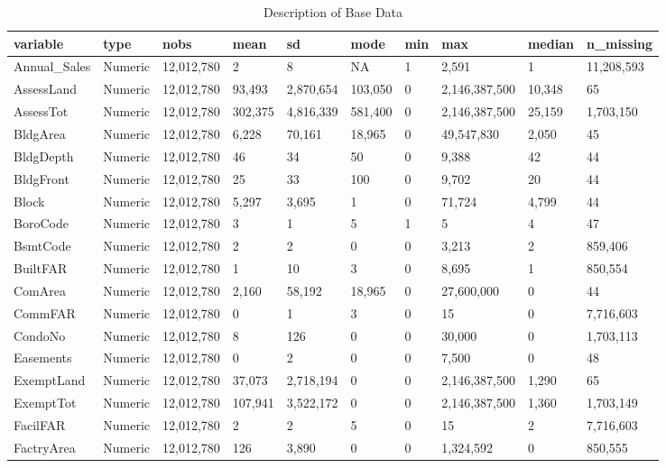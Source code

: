 \documentclass[conference,final,]{IEEEtran}
\begin{document}
\begin{table}

\caption{\label{tab:descripTable}\label{tab:descripTable} Description of Base Data}
\centering
\begin{tabular}[t]{l|l|l|l|l|l|l|l|l|l}
\hline
variable & type & nobs & mean & sd & mode & min & max & median & n\_missing\\
\hline
Annual\_Sales & Numeric & 12,012,780 & 2 & 8 & NA & 1 & 2,591 & 1 & 11,208,593\\
\hline
AssessLand & Numeric & 12,012,780 & 93,493 & 2,870,654 & 103,050 & 0 & 2,146,387,500 & 10,348 & 65\\
\hline
AssessTot & Numeric & 12,012,780 & 302,375 & 4,816,339 & 581,400 & 0 & 2,146,387,500 & 25,159 & 1,703,150\\
\hline
BldgArea & Numeric & 12,012,780 & 6,228 & 70,161 & 18,965 & 0 & 49,547,830 & 2,050 & 45\\
\hline
BldgDepth & Numeric & 12,012,780 & 46 & 34 & 50 & 0 & 9,388 & 42 & 44\\
\hline
BldgFront & Numeric & 12,012,780 & 25 & 33 & 100 & 0 & 9,702 & 20 & 44\\
\hline
Block & Numeric & 12,012,780 & 5,297 & 3,695 & 1 & 0 & 71,724 & 4,799 & 44\\
\hline
BoroCode & Numeric & 12,012,780 & 3 & 1 & 5 & 1 & 5 & 4 & 47\\
\hline
BsmtCode & Numeric & 12,012,780 & 2 & 2 & 0 & 0 & 3,213 & 2 & 859,406\\
\hline
BuiltFAR & Numeric & 12,012,780 & 1 & 10 & 3 & 0 & 8,695 & 1 & 850,554\\
\hline
ComArea & Numeric & 12,012,780 & 2,160 & 58,192 & 18,965 & 0 & 27,600,000 & 0 & 44\\
\hline
CommFAR & Numeric & 12,012,780 & 0 & 1 & 3 & 0 & 15 & 0 & 7,716,603\\
\hline
CondoNo & Numeric & 12,012,780 & 8 & 126 & 0 & 0 & 30,000 & 0 & 1,703,113\\
\hline
Easements & Numeric & 12,012,780 & 0 & 2 & 0 & 0 & 7,500 & 0 & 48\\
\hline
ExemptLand & Numeric & 12,012,780 & 37,073 & 2,718,194 & 0 & 0 & 2,146,387,500 & 1,290 & 65\\
\hline
ExemptTot & Numeric & 12,012,780 & 107,941 & 3,522,172 & 0 & 0 & 2,146,387,500 & 1,360 & 1,703,149\\
\hline
FacilFAR & Numeric & 12,012,780 & 2 & 2 & 5 & 0 & 15 & 2 & 7,716,603\\
\hline
FactryArea & Numeric & 12,012,780 & 126 & 3,890 & 0 & 0 & 1,324,592 & 0 & 850,555\\

\end{tabular}
\end{table}
\end{document}
